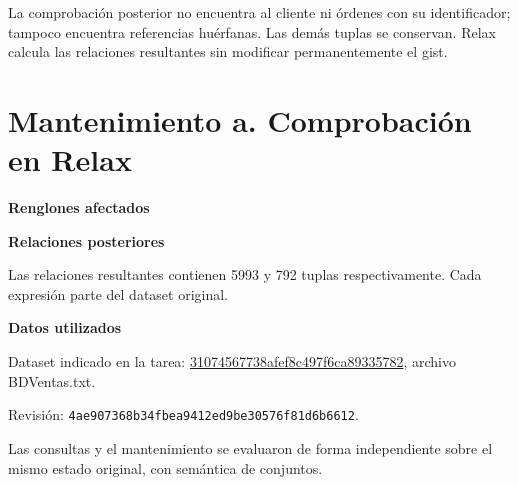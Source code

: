 La comprobación posterior no encuentra al cliente ni órdenes con su identificador; tampoco encuentra referencias huérfanas. Las demás tuplas se conservan. Relax calcula las relaciones resultantes sin modificar permanentemente el gist.
\newpage
\section*{Mantenimiento a. Comprobación en Relax}
\textbf{Renglones afectados}

\textbf{Relaciones posteriores}


Las relaciones resultantes contienen 5993 y 792 tuplas respectivamente. Cada expresión parte del dataset original.

\textbf{Datos utilizados}\par
Dataset indicado en la tarea: \href{https://gist.github.com/cyrus96/31074567738afef8c497f6ca89335782}{31074567738afef8c497f6ca89335782}, archivo BDVentas.txt.\par Revisión: \texttt{4ae907368b34fbea9412ed9be30576f81d6b6612}.\par
Las consultas y el mantenimiento se evaluaron de forma independiente sobre el mismo estado original, con semántica de conjuntos.
